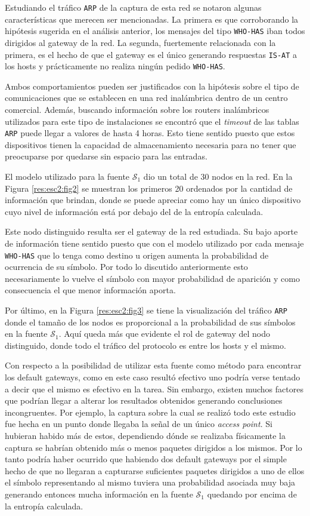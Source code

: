 Estudiando el tráfico \texttt{ARP} de la captura de esta red se notaron algunas
características que merecen ser mencionadas. La primera es que corroborando la
hipótesis sugerida en el análisis anterior, los mensajes del tipo
\texttt{WHO-HAS} iban todos dirigidos al gateway de la red. La segunda,
fuertemente relacionada con la primera, es el hecho de que el gateway es el
único generando respuestas \texttt{IS-AT} a los hosts y prácticamente no realiza
ningún pedido \texttt{WHO-HAS}.

Ambos comportamientos pueden ser justificados con la hipótesis sobre el tipo de
comunicaciones que se establecen en una red inalámbrica dentro de un centro
comercial. Además, buscando información sobre los routers inalámbricos
utilizados para este tipo de instalaciones se encontró que el \emph{timeout} de
las tablas \texttt{ARP} puede llegar a valores de hasta 4 horas. Esto tiene
sentido puesto que estos dispositivos tienen la capacidad de almacenamiento
necesaria para no tener que preocuparse por quedarse sin espacio para las
entradas.

El modelo utilizado para la fuente $\mathcal{S}_1$ dio un total de 30 nodos en la
red. En la Figura \ref{res:esc2:fig2} se muestran los primeros 20 ordenados por
la cantidad de información que brindan, donde se puede apreciar como hay un
único dispositivo cuyo nivel de información está por debajo del de la entropía
calculada.

Este nodo distinguido resulta ser el gateway de la red estudiada. Su bajo aporte
de información tiene sentido puesto que con el modelo utilizado por cada mensaje
\texttt{WHO-HAS} que lo tenga como destino u origen aumenta la probabilidad de
ocurrencia de su símbolo. Por todo lo discutido anteriormente esto
necesariamente lo vuelve el símbolo con mayor probabilidad de aparición y como
consecuencia el que menor información aporta.

Por último, en la Figura \ref{res:esc2:fig3} se tiene la visualización del
tráfico \texttt{ARP} donde el tamaño de los nodos es proporcional a la
probabilidad de sus símbolos en la fuente $\mathcal{S}_1$. Aquí queda más que
evidente el rol de gateway del nodo distinguido, donde todo el tráfico del
protocolo es entre los hosts y el mismo.

Con respecto a la posibilidad de utilizar esta fuente como método para encontrar
los default gateways, como en este caso resultó efectivo uno podría verse
tentado a decir que el mismo es efectivo en la tarea. Sin embargo, existen muchos
factores que podrían llegar a alterar los resultados obtenidos generando
conclusiones incongruentes. Por ejemplo, la captura sobre la cual se realizó
todo este estudio fue hecha en un punto donde llegaba la señal de un único
\emph{access point}. Si hubieran habido más de estos, dependiendo dónde se
realizaba físicamente la captura se habrían obtenido más o menos paquetes
dirigidos a los mismos. Por lo tanto podría haber ocurrido que habiendo dos
default gateways por el simple hecho de que no llegaran a capturarse suficientes
paquetes dirigidos a uno de ellos el símbolo representando al mismo tuviera una
probabilidad asociada muy baja generando entonces mucha información en la fuente
$\mathcal{S}_1$ quedando por encima de la entropía calculada.

